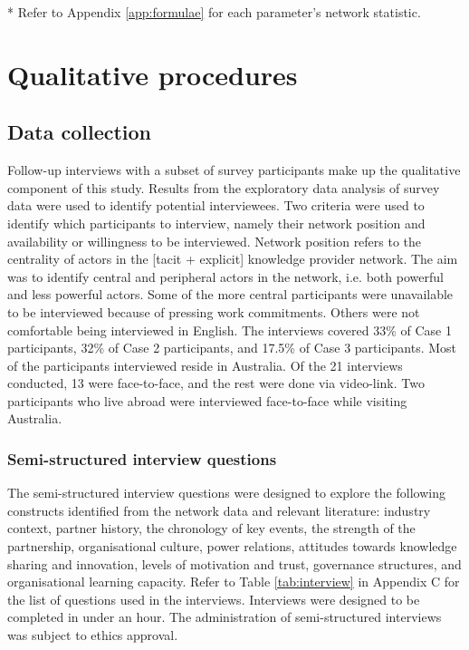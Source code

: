 \begin{table}[!htbp]
{\begin{threeparttable}
\begin{tablenotes}
\footnotesize
\item[*] Refer to Appendix \ref{app:formulae} for each parameter's network statistic.
\end{tablenotes}
\end{threeparttable}
}%
\end{table}

\section{Qualitative procedures}

\subsection{Data collection}

Follow-up interviews with a subset of survey participants make up the qualitative component of this study. Results from the exploratory data analysis of survey data were used to identify potential interviewees. Two criteria were used to identify which participants to interview, namely their network position and availability or willingness to be interviewed. Network position refers to the centrality of actors in the [tacit + explicit] knowledge provider network. The aim was to identify central and peripheral actors in the network, i.e. both powerful and less powerful actors. Some of the more central participants were unavailable to be interviewed because of pressing work commitments. Others were not comfortable being interviewed in English. The interviews covered 33\% of Case 1 participants, 32\% of Case 2 participants, and 17.5\% of Case 3 participants. Most of the participants interviewed reside in Australia. Of the 21 interviews conducted, 13 were face-to-face, and the rest were done via video-link. Two participants who live abroad were interviewed face-to-face while visiting Australia. \medskip

\subsubsection{Semi-structured interview questions}

The semi-structured interview questions were designed to explore the following constructs identified from the network data and relevant literature: industry context, partner history, the chronology of key events, the strength of the partnership, organisational culture, power relations, attitudes towards knowledge sharing and innovation, levels of motivation and trust, governance structures, and organisational learning capacity. Refer to Table \ref{tab:interview} in Appendix C for the list of questions used in the interviews. Interviews were designed to be completed in under an hour. The administration of semi-structured interviews was subject to ethics approval. 

